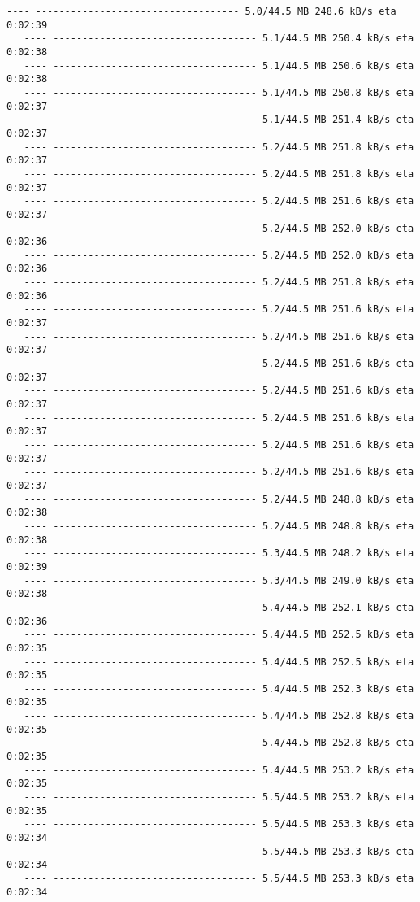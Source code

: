 \documentclass[11pt]{article}
\begin{document}
\begin{Verbatim}[commandchars=\\\{\}]
   ---- ----------------------------------- 5.0/44.5 MB 248.6 kB/s eta 0:02:39
   ---- ----------------------------------- 5.1/44.5 MB 250.4 kB/s eta 0:02:38
   ---- ----------------------------------- 5.1/44.5 MB 250.6 kB/s eta 0:02:38
   ---- ----------------------------------- 5.1/44.5 MB 250.8 kB/s eta 0:02:37
   ---- ----------------------------------- 5.1/44.5 MB 251.4 kB/s eta 0:02:37
   ---- ----------------------------------- 5.2/44.5 MB 251.8 kB/s eta 0:02:37
   ---- ----------------------------------- 5.2/44.5 MB 251.8 kB/s eta 0:02:37
   ---- ----------------------------------- 5.2/44.5 MB 251.6 kB/s eta 0:02:37
   ---- ----------------------------------- 5.2/44.5 MB 252.0 kB/s eta 0:02:36
   ---- ----------------------------------- 5.2/44.5 MB 252.0 kB/s eta 0:02:36
   ---- ----------------------------------- 5.2/44.5 MB 251.8 kB/s eta 0:02:36
   ---- ----------------------------------- 5.2/44.5 MB 251.6 kB/s eta 0:02:37
   ---- ----------------------------------- 5.2/44.5 MB 251.6 kB/s eta 0:02:37
   ---- ----------------------------------- 5.2/44.5 MB 251.6 kB/s eta 0:02:37
   ---- ----------------------------------- 5.2/44.5 MB 251.6 kB/s eta 0:02:37
   ---- ----------------------------------- 5.2/44.5 MB 251.6 kB/s eta 0:02:37
   ---- ----------------------------------- 5.2/44.5 MB 251.6 kB/s eta 0:02:37
   ---- ----------------------------------- 5.2/44.5 MB 251.6 kB/s eta 0:02:37
   ---- ----------------------------------- 5.2/44.5 MB 248.8 kB/s eta 0:02:38
   ---- ----------------------------------- 5.2/44.5 MB 248.8 kB/s eta 0:02:38
   ---- ----------------------------------- 5.3/44.5 MB 248.2 kB/s eta 0:02:39
   ---- ----------------------------------- 5.3/44.5 MB 249.0 kB/s eta 0:02:38
   ---- ----------------------------------- 5.4/44.5 MB 252.1 kB/s eta 0:02:36
   ---- ----------------------------------- 5.4/44.5 MB 252.5 kB/s eta 0:02:35
   ---- ----------------------------------- 5.4/44.5 MB 252.5 kB/s eta 0:02:35
   ---- ----------------------------------- 5.4/44.5 MB 252.3 kB/s eta 0:02:35
   ---- ----------------------------------- 5.4/44.5 MB 252.8 kB/s eta 0:02:35
   ---- ----------------------------------- 5.4/44.5 MB 252.8 kB/s eta 0:02:35
   ---- ----------------------------------- 5.4/44.5 MB 253.2 kB/s eta 0:02:35
   ---- ----------------------------------- 5.5/44.5 MB 253.2 kB/s eta 0:02:35
   ---- ----------------------------------- 5.5/44.5 MB 253.3 kB/s eta 0:02:34
   ---- ----------------------------------- 5.5/44.5 MB 253.3 kB/s eta 0:02:34
   ---- ----------------------------------- 5.5/44.5 MB 253.3 kB/s eta 0:02:34

\end{Verbatim}
\end{document}
